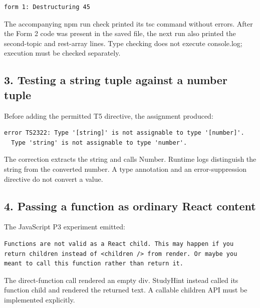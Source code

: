 \documentclass[10pt,a4paper]{article}
\begin{document}
\begin{lstlisting}[language={}]
form 1: Destructuring 45
\end{lstlisting}

The accompanying npm run check printed its tsc command without errors. After the Form 2 code was present in the saved file, the next run also printed the second-topic and rest-array lines. Type checking does not execute console.log; execution must be checked separately.

\subsection{3. Testing a string tuple against a number tuple}


Before adding the permitted T5 directive, the assignment produced:

\begin{lstlisting}[language={}]
error TS2322: Type '[string]' is not assignable to type '[number]'.
  Type 'string' is not assignable to type 'number'.
\end{lstlisting}

The correction extracts the string and calls Number. Runtime logs distinguish the string from the converted number. A type annotation and an error-suppression directive do not convert a value.

\subsection{4. Passing a function as ordinary React content}


The JavaScript P3 experiment emitted:

\begin{lstlisting}[language={}]
Functions are not valid as a React child. This may happen if you return children instead of <children /> from render. Or maybe you meant to call this function rather than return it.
\end{lstlisting}

The direct-function call rendered an empty div. StudyHint instead called its function child and rendered the returned text. A callable children API must be implemented explicitly.

\end{document}
